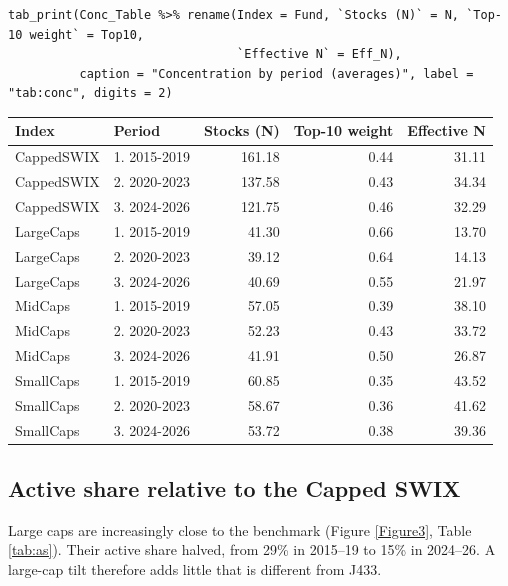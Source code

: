 \documentclass[11pt,preprint]{elsarticle}
\let\origtable\table
\let\endorigtable\endtable
\renewenvironment{table}[1][2] {
    \expandafter\origtable\expandafter[H]
} {
    \endorigtable
}
\numberwithin{equation}{section}
\numberwithin{figure}{section}
\numberwithin{table}{section}
\begin{document}
\begin{verbatim}
tab_print(Conc_Table %>% rename(Index = Fund, `Stocks (N)` = N, `Top-10 weight` = Top10,
                                `Effective N` = Eff_N),
          caption = "Concentration by period (averages)", label = "tab:conc", digits = 2)
\end{verbatim}

\begin{table}[!htbp]
\centering
\caption{Concentration by period (averages)} 
\label{tab:conc}
\begingroup\footnotesize
\begin{tabular}{llrrr}
  \hline
Index & Period & Stocks (N) & Top-10 weight & Effective N \\ 
  \hline
CappedSWIX & 1. 2015-2019 & 161.18 & 0.44 & 31.11 \\ 
  CappedSWIX & 2. 2020-2023 & 137.58 & 0.43 & 34.34 \\ 
  CappedSWIX & 3. 2024-2026 & 121.75 & 0.46 & 32.29 \\ 
  LargeCaps & 1. 2015-2019 & 41.30 & 0.66 & 13.70 \\ 
  LargeCaps & 2. 2020-2023 & 39.12 & 0.64 & 14.13 \\ 
  LargeCaps & 3. 2024-2026 & 40.69 & 0.55 & 21.97 \\ 
  MidCaps & 1. 2015-2019 & 57.05 & 0.39 & 38.10 \\ 
  MidCaps & 2. 2020-2023 & 52.23 & 0.43 & 33.72 \\ 
  MidCaps & 3. 2024-2026 & 41.91 & 0.50 & 26.87 \\ 
  SmallCaps & 1. 2015-2019 & 60.85 & 0.35 & 43.52 \\ 
  SmallCaps & 2. 2020-2023 & 58.67 & 0.36 & 41.62 \\ 
  SmallCaps & 3. 2024-2026 & 53.72 & 0.38 & 39.36 \\ 
   \hline
\end{tabular}
\endgroup
\end{table}

\subsection{Active share relative to the Capped
SWIX}\label{active-share-relative-to-the-capped-swix}

Large caps are increasingly close to the benchmark (Figure
\ref{Figure3}, Table \ref{tab:as}). Their active share halved, from 29\%
in 2015--19 to 15\% in 2024--26. A large-cap tilt therefore adds little
that is different from J433.
\end{document}
